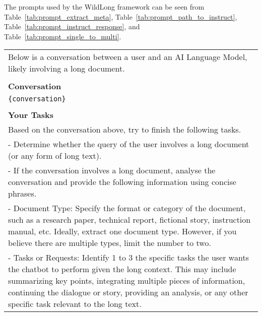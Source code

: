 \label{sec:appendix_prompt}

The prompts used by the WildLong framework can be seen from Table~\ref{tab:prompt_extract_meta}, Table~\ref{tab:prompt_path_to_instruct}, Table~\ref{tab:prompt_instruct_response}, and Table~\ref{tab:prompt_single_to_multi}.

\begin{table}[h!]\centering
\begin{minipage}{\textwidth}
\centering
\begin{tcolorbox} 
    \centering
   
      \small
    \begin{tabular}{p{}}
    Below is a conversation between a user and an AI Language Model, likely involving a long document.\\
    \\ \textbf{Conversation}
         \\ {\tt \{conversation\}} \\ 
         \\ \textbf{Your Tasks}
         \\ Based on the conversation above, try to finish the following tasks.
         \\ - Determine whether the query of the user involves a long document (or any form of long text). 
         \\ - If the conversation involves a long document, analyse the conversation and provide the following information using concise phrases. 
         \\ \hspace{0.4em} - Document Type: Specify the format or category of the document, such as a research paper, technical report, fictional story, instruction manual, etc. Ideally, extract one document type. However, if you believe there are multiple types, limit the number to two.
         \\ \hspace{0.4em} - Tasks or Requests: Identify 1 to 3 the specific tasks the user wants the chatbot to perform given the long context. This may include summarizing key points, integrating multiple pieces of information, continuing the dialogue or story, providing an analysis, or any other specific task relevant to the long text.

\end{tabular}
\end{tcolorbox}
\end{minipage}
\end{table}
